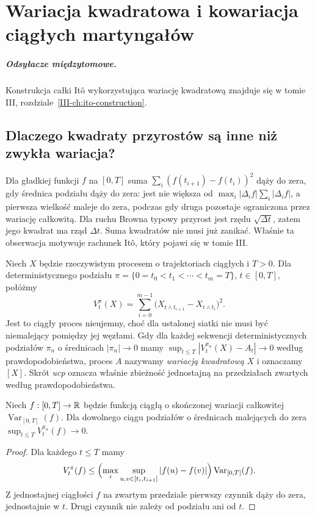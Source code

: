 \chapter{Wariacja kwadratowa i kowariacja ciągłych martyngałów}
\label{ch:quadratic-cont}
\paragraph{Odsyłacze międzytomowe.} Konstrukcja całki Itô wykorzystująca wariację kwadratową znajduje się w tomie III, rozdziale~\ref{III-ch:ito-construction}.


\section{Dlaczego kwadraty przyrostów są inne niż zwykła wariacja?}
Dla gładkiej funkcji $f$ na $[0,T]$ suma
$\sum_i(f(t_{i+1})-f(t_i))^2$ dąży do zera, gdy
średnica podziału dąży do zera: jest nie większa od
$\max_i|\Delta_i f|\sum_i|\Delta_i f|$, a pierwsza
wielkość maleje do zera, podczas gdy druga pozostaje
ograniczona przez wariację całkowitą. Dla ruchu Browna
typowy przyrost jest rzędu $\sqrt{\Delta t}$, zatem
jego kwadrat ma rząd $\Delta t$. Suma kwadratów
nie musi już zanikać. Właśnie ta obserwacja motywuje
rachunek Itô, który pojawi się w tomie III.

\begin{definicja}
Niech $X$ będzie rzeczywistym procesem o trajektoriach
ciągłych i $T>0$. Dla deterministycznego podziału
$\pi=\{0=t_0<t_1<\cdots<t_m=T\}$, $t\in[0,T]$,
połóżmy
\[
V_t^\pi(X)=\sum_{i=0}^{m-1}
\bigl(X_{t\wedge t_{i+1}}-X_{t\wedge t_i}\bigr)^2.
\]
Jest to ciągły proces nieujemny, choć dla ustalonej
siatki nie musi być niemalejący pomiędzy jej węzłami.
Gdy dla każdej sekwencji deterministycznych podziałów
$\pi_n$ o średnicach $|\pi_n|\to0$ mamy
$\sup_{t\le T}|V_t^{\pi_n}(X)-A_t|\to0$
według prawdopodobieństwa, proces $A$ nazywamy
\emph{wariacją kwadratową} $X$ i oznaczamy $[X]$.
Skrót \emph{ucp} oznacza właśnie zbieżność jednostajną
na przedziałach zwartych według prawdopodobieństwa.
\end{definicja}

\begin{lemat}
Niech $f:[0,T]\to\mathbb{R}$ będzie funkcją ciągłą o
skończonej wariacji całkowitej $\operatorname{Var}_{[0,T]}(f)$.
Dla dowolnego ciągu podziałów o średnicach malejących
do zera
$\sup_{t\le T}V_t^{\pi_n}(f)\to0$.
\end{lemat}
\begin{proof}
Dla każdego $t\le T$ mamy
\[
V_t^\pi(f)\le
\Bigl(\max_i\sup_{u,v\in[t_i,t_{i+1}]}|f(u)-f(v)|\Bigr)
\operatorname{Var}_{[0,T]}(f).
\]
Z jednostajnej ciągłości $f$ na zwartym przedziale
pierwszy czynnik dąży do zera, jednostajnie w $t$.
Drugi czynnik nie zależy od podziału ani od $t$.
\end{proof}

